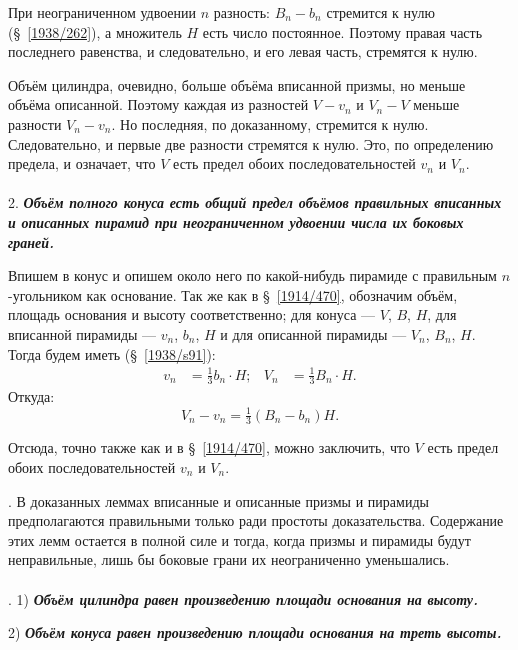 При неограниченном удвоении $n$ разность: $B_n-b_n$ стремится к нулю (§~\ref{1938/262}), а множитель $H$ есть число постоянное.
Поэтому правая часть последнего равенства, и следовательно, и его левая часть, стремятся к нулю.

Объём цилиндра, очевидно, больше объёма вписанной призмы, но меньше объёма описанной.
Поэтому каждая из разностей $V-v_n$ и $V_n-V$ меньше разности $V_n-v_n$. 
Но последняя, по доказанному, стремится к нулю.
Следовательно, и первые две разности стремятся к нулю.
Это, по определению предела, и означает, что $V$ есть предел обоих последовательностей $v_n$ и $V_n$.

\paragraph{}\label{1914/471}  2. 
\textbf{\emph{Объём полного конуса есть общий предел объёмов правильных вписанных и описанных пирамид при неограниченном удвоении числа их боковых граней.}}

Впишем в конус и опишем около него по какой-нибудь пирамиде с правильным $n$-угольником как основание.
Так же как в §~\ref{1914/470}, обозначим объём, площадь основания и высоту соответственно; 
для конуса — $V$, $B$, $H$, 
для вписанной пирамиды — $v_n$, $b_n$, $H$ 
и для описанной пирамиды — $V_n$, $B_n$, $H$.
Тогда будем иметь (§~\ref{1938/s91}): 
\begin{align*}
v_n&=\tfrac13 b_n\cdot H;
&
V_n&=\tfrac13 B_n\cdot H.\end{align*}
Откуда:
\[V_n-v_n=\tfrac13(B_n-b_n)H.\]

Отсюда, точно также как и в §~\ref{1914/470}, можно заключить, что $V$ есть предел обоих последовательностей $v_n$ и $V_n$.

\medskip

. В доказанных леммах вписанные и описанные призмы и пирамиды предполагаются правильными только ради простоты доказательства. Содержание этих лемм остается в полной силе и тогда, когда призмы и пирамиды будут неправильные, лишь бы боковые грани их неограниченно уменьшались. 


\paragraph{}\label{1938/s120}
.
1) \textbf{\emph{Объём цилиндра равен произведению площади основания на высоту.}}

2) \textbf{\emph{Объём конуса равен произведению площади основания на треть высоты.}}

